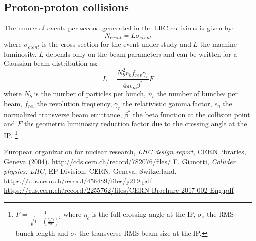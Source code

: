 \documentclass[a4paper, oneside]{book}
\begin{document}
			\subsection{Proton-proton collisions}
			The numer of events per second generated in the LHC collisions is given by:
			$$
			N_{event} = L\sigma_{event}
			$$
			where $\sigma_{event}$ is the cross section for the event under study and $L$ the machine luminosity. $L$ depends only on the beam parameters and can be written for a Gaussian beam distribution as: 
			$$
			L = \frac{N_b^2n_bf_{rev}\gamma_r}{4\pi\epsilon_n\beta^*}F
			$$
			where $N_b$ is the number of particles per bunch, $n_b$ the number of bunches per beam, $f_{rev}$ the revolution frequency, $\gamma_r$ the relativistic gamma factor, $\epsilon_n$ the normalized transverse beam emittance, $\beta^*$ the beta function at the collision point and $F$ the geometric luminosity reduction factor due to the crossing angle at the IP.
			\footnote{ $F = \frac{1}{\sqrt{1+(\frac{\eta_c\sigma_z}{2\sigma^*})^2}}$ where $\eta_c$ is the full crossing angle at the IP, $\sigma_z$ the RMS bunch length and $\sigma_^*$ the transverse RMS beam size at the IP.}
	\begin{thebibliography}{3}
			 European organization for nuclear research, \textit{LHC design report}, CERN libraries, Geneva (2004). \url{http://cds.cern.ch/record/782076/files/}
			 F. Gianotti, \textit{Collider physics: LHC}, EP Division, CERN, Geneva, Switzerland. \url{https://cds.cern.ch/record/458489/files/p219.pdf}
			 \url{https://cds.cern.ch/record/2255762/files/CERN-Brochure-2017-002-Eng.pdf}
	\end{thebibliography}
\end{document}
